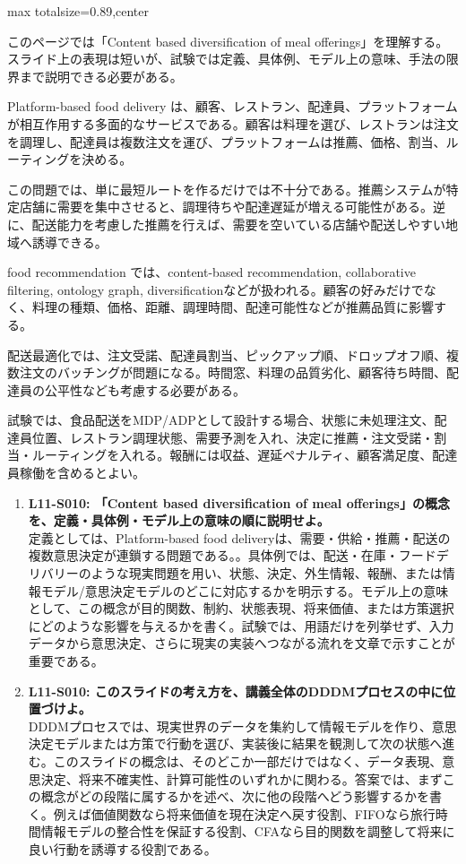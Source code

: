 \begin{minipage}[t]{0.58\textwidth}
\begin{adjustbox}{max totalsize={\textwidth}{0.89\textheight},center}
\begin{minipage}{\textwidth}\scriptsize
{}このページでは「Content based diversification of meal offerings」を理解する。スライド上の表現は短いが、試験では定義、具体例、モデル上の意味、手法の限界まで説明できる必要がある。\par
Platform-based food delivery は、顧客、レストラン、配達員、プラットフォームが相互作用する多面的なサービスである。顧客は料理を選び、レストランは注文を調理し、配達員は複数注文を運び、プラットフォームは推薦、価格、割当、ルーティングを決める。\par
この問題では、単に最短ルートを作るだけでは不十分である。推薦システムが特定店舗に需要を集中させると、調理待ちや配達遅延が増える可能性がある。逆に、配送能力を考慮した推薦を行えば、需要を空いている店舗や配送しやすい地域へ誘導できる。\par
food recommendation では、content-based recommendation, collaborative filtering, ontology graph, diversificationなどが扱われる。顧客の好みだけでなく、料理の種類、価格、距離、調理時間、配達可能性などが推薦品質に影響する。\par
配送最適化では、注文受諾、配達員割当、ピックアップ順、ドロップオフ順、複数注文のバッチングが問題になる。時間窓、料理の品質劣化、顧客待ち時間、配達員の公平性なども考慮する必要がある。\par
試験では、食品配送をMDP/ADPとして設計する場合、状態に未処理注文、配達員位置、レストラン調理状態、需要予測を入れ、決定に推薦・注文受諾・割当・ルーティングを入れる。報酬には収益、遅延ペナルティ、顧客満足度、配達員稼働を含めるとよい。\par{}\begin{enumerate}\item \textbf{L11-S010: 「Content based diversification of meal offerings」の概念を、定義・具体例・モデル上の意味の順に説明せよ。}\\定義としては、Platform-based food deliveryは、需要・供給・推薦・配送の複数意思決定が連鎖する問題である。。具体例では、配送・在庫・フードデリバリーのような現実問題を用い、状態、決定、外生情報、報酬、または情報モデル/意思決定モデルのどこに対応するかを明示する。モデル上の意味として、この概念が目的関数、制約、状態表現、将来価値、または方策選択にどのような影響を与えるかを書く。試験では、用語だけを列挙せず、入力データから意思決定、さらに現実の実装へつながる流れを文章で示すことが重要である。\item \textbf{L11-S010: このスライドの考え方を、講義全体のDDDMプロセスの中に位置づけよ。}\\DDDMプロセスでは、現実世界のデータを集約して情報モデルを作り、意思決定モデルまたは方策で行動を選び、実装後に結果を観測して次の状態へ進む。このスライドの概念は、そのどこか一部だけではなく、データ表現、意思決定、将来不確実性、計算可能性のいずれかに関わる。答案では、まずこの概念がどの段階に属するかを述べ、次に他の段階へどう影響するかを書く。例えば価値関数なら将来価値を現在決定へ戻す役割、FIFOなら旅行時間情報モデルの整合性を保証する役割、CFAなら目的関数を調整して将来に良い行動を誘導する役割である。\end{enumerate}

\end{minipage}
\end{adjustbox}
\end{minipage}
